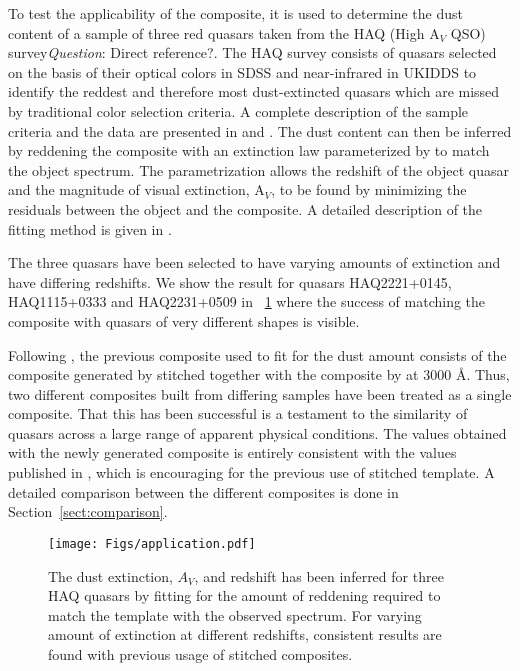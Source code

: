 \documentclass{aa}    %
\newcommand{\figref}[1]{\ref{fig:#1}}
\newcommand{\Fig}[1]{\figurename~\figref{#1}}
\newcommand{\fig}[1]{\Fig{#1}}
\newcommand{\figlabel}[1]{\label{fig:#1}}
\newcommand{\sectionname}{Section}
\newcommand{\Sect}[1]{\sectionname~\ref{sect:#1}}
\newcommand{\sect}[1]{\Sect{#1}}
\newcommand{\todo}[3]{{\color{#2}\emph{#1}: #3}}
\newcommand{\qtodo}[1]{\todo{Question}{red}{#1}}
\begin{document}
To test the applicability of the composite, it is used to determine the dust content of a sample of three red quasars taken from the HAQ (High A$_V$ QSO) survey\qtodo{Direct reference?}. The HAQ survey consists of quasars selected on the basis of their optical colors in SDSS and near-infrared in UKIDDS to identify the reddest and therefore most dust-extincted quasars which are missed by traditional color selection criteria. A complete description of the sample criteria and the data are presented in \citet{Fynbo2013} and \citet{Krogager2015}. The dust content can then be inferred by reddening the composite with an extinction law parameterized by \cite{Gordon2003} to match the object spectrum. The parametrization allows the redshift of the object quasar and the magnitude of visual extinction, A$_V$, to be found by minimizing the residuals between the object and the composite. A detailed description of the fitting method is given in \cite{Krogager2015}.

The three quasars have been selected to have varying amounts of extinction and have differing redshifts. We show the result for quasars HAQ2221+0145, HAQ1115+0333 and HAQ2231+0509 in \fig{application} where the success of matching the composite with quasars of very different shapes is visible. 

Following \cite{Wang2012}, the previous composite used to fit for the dust amount consists of the composite generated by \cite{VandenBerk2001} stitched together with the composite by \cite{Glikman2006} at 3000 \AA. Thus, two different composites built from differing samples have been treated as a single composite. That this has been successful is a testament to the similarity of quasars across a large range of apparent physical conditions. 
The values obtained with the newly generated composite is entirely consistent with the values published in \cite{Krogager2015}, which is encouraging for the previous use of stitched template. A detailed comparison between the different composites is done in \sect{comparison}.

\begin{figure}[t!]
 \centering
 \texttt{[image: Figs/application.pdf]}
 \caption[]{The dust extinction, $A_V$, and redshift has been inferred for three HAQ quasars by fitting for the amount of reddening required to match the template with the observed spectrum. For varying amount of extinction at different redshifts, consistent results are found with previous usage of stitched composites.}
 \figlabel{application}
\end{figure}
 
\end{document}
